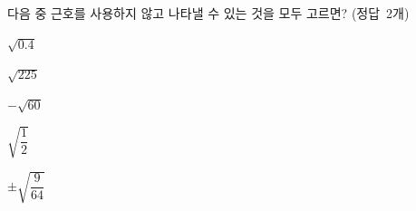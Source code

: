 다음 중 근호를 사용하지 않고 나타낼 수 있는 것을 모두 고르면? \mbox{(정답 2개)}
\begin{choices32}{\rule[-3ex]{0pt}{8ex}$\sqrt{0.4}$}{\rule[-3ex]{0pt}{8ex}$\sqrt{225}$}{\rule[-3ex]{0pt}{8ex}$-\sqrt{60}$}{\rule[-3ex]{0pt}{8ex}$\sqrt{\dfrac{1}{2}}$}{\rule[-3ex]{0pt}{8ex}$\pm\sqrt{\dfrac{9}{64}}$}\end{choices32}
